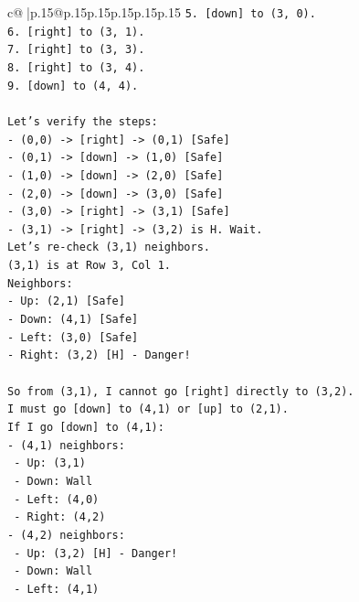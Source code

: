 \documentclass{article}
\begin{document}
{\begin{supertabular}{c@{$\;$}|p{.15\linewidth}@{}p{.15\linewidth}p{.15\linewidth}p{.15\linewidth}p{.15\linewidth}p{.15\linewidth}}
{{{\texttt{5. {[}down{]} to (3, 0).} \\
\texttt{6. {[}right{]} to (3, 1).} \\
\texttt{7. {[}right{]} to (3, 3).} \\
\texttt{8. {[}right{]} to (3, 4).} \\
\texttt{9. {[}down{]} to (4, 4).} \\
\\ 
\texttt{Let's verify the steps:} \\
\texttt{{-} (0,0) {-}> {[}right{]} {-}> (0,1) {[}Safe{]}} \\
\texttt{{-} (0,1) {-}> {[}down{]} {-}> (1,0) {[}Safe{]}} \\
\texttt{{-} (1,0) {-}> {[}down{]} {-}> (2,0) {[}Safe{]}} \\
\texttt{{-} (2,0) {-}> {[}down{]} {-}> (3,0) {[}Safe{]}} \\
\texttt{{-} (3,0) {-}> {[}right{]} {-}> (3,1) {[}Safe{]}} \\
\texttt{{-} (3,1) {-}> {[}right{]} {-}> (3,2) is H. Wait.} \\
\texttt{Let's re{-}check (3,1) neighbors.} \\
\texttt{(3,1) is at Row 3, Col 1.} \\
\texttt{Neighbors:} \\
\texttt{{-} Up: (2,1) {[}Safe{]}} \\
\texttt{{-} Down: (4,1) {[}Safe{]}} \\
\texttt{{-} Left: (3,0) {[}Safe{]}} \\
\texttt{{-} Right: (3,2) {[}H{]} {-} Danger!} \\
\\ 
\texttt{So from (3,1), I cannot go {[}right{]} directly to (3,2).} \\
\texttt{I must go {[}down{]} to (4,1) or {[}up{]} to (2,1).} \\
\texttt{If I go {[}down{]} to (4,1):} \\
\texttt{{-} (4,1) neighbors:} \\
\texttt{  {-} Up: (3,1)} \\
\texttt{  {-} Down: Wall} \\
\texttt{  {-} Left: (4,0)} \\
\texttt{  {-} Right: (4,2)} \\
\texttt{{-} (4,2) neighbors:} \\
\texttt{  {-} Up: (3,2) {[}H{]} {-} Danger!} \\
\texttt{  {-} Down: Wall} \\
\texttt{  {-} Left: (4,1)} \\
}}}
\end{supertabular}}
\end{document}
